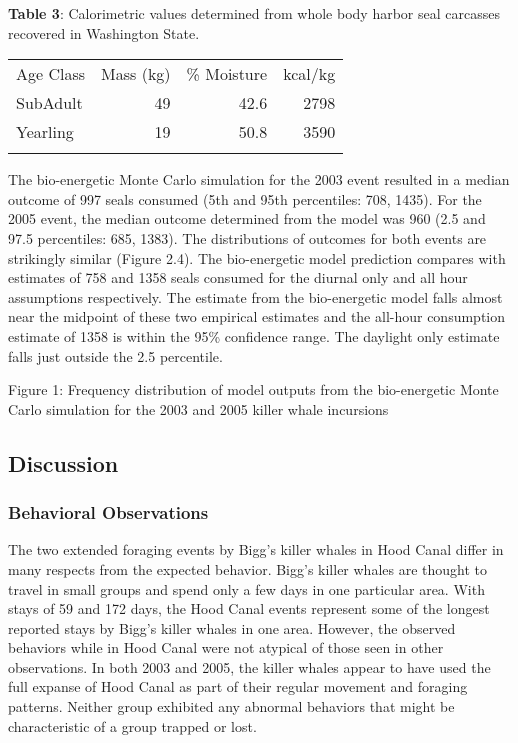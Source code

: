 \textbf{Table 3}: Calorimetric values determined from whole body harbor
seal carcasses recovered in Washington State.

\begin{longtable}[c]{@{}lrrr@{}}
\hline\noalign{\medskip}
Age Class & Mass (kg) & \% Moisture & kcal/kg
\\\noalign{\medskip}
\hline\noalign{\medskip}
SubAdult & 49 & 42.6 & 2798
\\\noalign{\medskip}
Yearling & 19 & 50.8 & 3590
\\\noalign{\medskip}
\hline
\end{longtable}

The bio-energetic Monte Carlo simulation for the 2003 event resulted in
a median outcome of 997 seals consumed (5th and 95th percentiles: 708,
1435). For the 2005 event, the median outcome determined from the model
was 960 (2.5 and 97.5 percentiles: 685, 1383). The distributions of
outcomes for both events are strikingly similar (Figure 2.4). The
bio-energetic model prediction compares with estimates of 758 and 1358
seals consumed for the diurnal only and all hour assumptions
respectively. The estimate from the bio-energetic model falls almost
near the midpoint of these two empirical estimates and the all-hour
consumption estimate of 1358 is within the 95\% confidence range. The
daylight only estimate falls just outside the 2.5 percentile.

Figure 1: Frequency distribution of model outputs from the bio-energetic
Monte Carlo simulation for the 2003 and 2005 killer whale incursions

\subsection{Discussion}\label{discussion}

\subsubsection{Behavioral Observations}\label{behavioral-observations-2}

The two extended foraging events by Bigg's killer whales in Hood Canal
differ in many respects from the expected behavior. Bigg's killer whales
are thought to travel in small groups and spend only a few days in one
particular area. With stays of 59 and 172 days, the Hood Canal events
represent some of the longest reported stays by Bigg's killer whales in
one area. However, the observed behaviors while in Hood Canal were not
atypical of those seen in other observations. In both 2003 and 2005, the
killer whales appear to have used the full expanse of Hood Canal as part
of their regular movement and foraging patterns. Neither group exhibited
any abnormal behaviors that might be characteristic of a group trapped
or lost.

